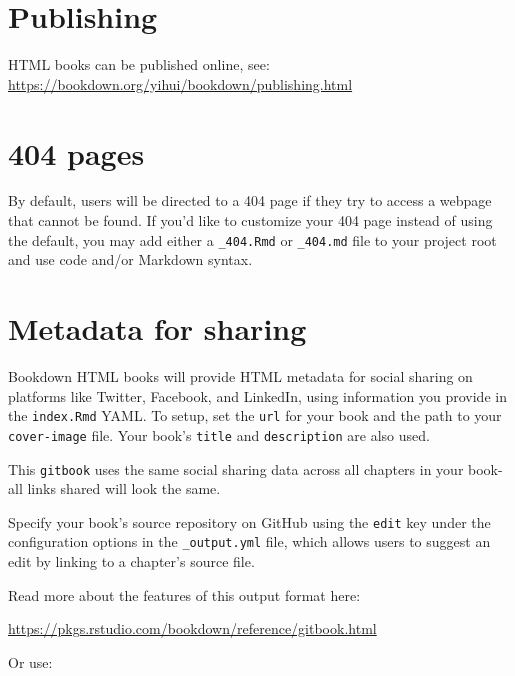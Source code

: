 \documentclass[
]{book}
\theoremstyle{definition}
\theoremstyle{definition}
\theoremstyle{definition}
\theoremstyle{definition}
\theoremstyle{remark}
\begin{document}
\hypertarget{publishing}{%
\section{Publishing}\label{publishing}}

HTML books can be published online, see: \url{https://bookdown.org/yihui/bookdown/publishing.html}

\hypertarget{pages}{%
\section{404 pages}\label{pages}}

By default, users will be directed to a 404 page if they try to access a webpage that cannot be found. If you'd like to customize your 404 page instead of using the default, you may add either a \texttt{\_404.Rmd} or \texttt{\_404.md} file to your project root and use code and/or Markdown syntax.

\hypertarget{metadata-for-sharing}{%
\section{Metadata for sharing}\label{metadata-for-sharing}}

Bookdown HTML books will provide HTML metadata for social sharing on platforms like Twitter, Facebook, and LinkedIn, using information you provide in the \texttt{index.Rmd} YAML. To setup, set the \texttt{url} for your book and the path to your \texttt{cover-image} file. Your book's \texttt{title} and \texttt{description} are also used.

This \texttt{gitbook} uses the same social sharing data across all chapters in your book- all links shared will look the same.

Specify your book's source repository on GitHub using the \texttt{edit} key under the configuration options in the \texttt{\_output.yml} file, which allows users to suggest an edit by linking to a chapter's source file.

Read more about the features of this output format here:

\url{https://pkgs.rstudio.com/bookdown/reference/gitbook.html}

Or use:

  
\end{document}
